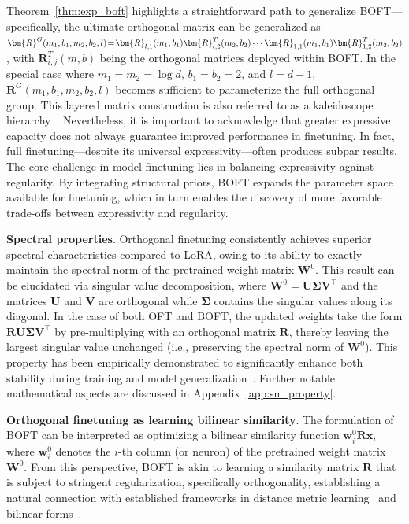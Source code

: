 Theorem~\ref{thm:exp_boft} highlights a straightforward path to generalize BOFT—specifically, the ultimate orthogonal matrix can be generalized as $\thickmuskip=2mu \medmuskip=2mu \bm{R}^G(m_1,b_1,m_2,b_2,l)=\bm{R}_{l,1}(m_1,b_1)\bm{R}_{l,2}^T(m_2,b_2)\cdots\bm{R}_{1,1}(m_1,b_1)\bm{R}_{1,2}^T(m_2,b_2)$, with $\bm{R}_{i,j}^T(m,b)$ being the orthogonal matrices deployed within BOFT. In the special case where $m_1=m_2=\log d$, $b_1=b_2=2$, and $l=d-1$, $\bm{R}^G(m_1,b_1,m_2,b_2,l)$ becomes sufficient to parameterize the full orthogonal group. This layered matrix construction is also referred to as a kaleidoscope hierarchy~\cite{dao2019kaleidoscope}. Nevertheless, it is important to acknowledge that greater expressive capacity does not always guarantee improved performance in finetuning. In fact, full finetuning—despite its universal expressivity—often produces subpar results. The core challenge in model finetuning lies in balancing expressivity against regularity. By integrating structural priors, BOFT expands the parameter space available for finetuning, which in turn enables the discovery of more favorable trade-offs between expressivity and regularity.

\textbf{Spectral properties}. Orthogonal finetuning consistently achieves superior spectral characteristics compared to LoRA, owing to its ability to exactly maintain the spectral norm of the pretrained weight matrix $\bm{W}^0$. This result can be elucidated via singular value decomposition, where $\bm{W}^0=\bm{U}\bm{\Sigma}\bm{V}^\top$ and the matrices $\bm{U}$ and $\bm{V}$ are orthogonal while $\bm{\Sigma}$ contains the singular values along its diagonal. In the case of both OFT and BOFT, the updated weights take the form $\bm{R}\bm{U}\bm{\Sigma}\bm{V}^\top$ by pre-multiplying with an orthogonal matrix $\bm{R}$, thereby leaving the largest singular value unchanged (i.e., preserving the spectral norm of $\bm{W}^0$). This property has been empirically demonstrated to significantly enhance both stability during training and model generalization~\cite{miyato2018spectral,yoshida2017spectral}. Further notable mathematical aspects are discussed in Appendix~\ref{app:sn_property}.

\textbf{Orthogonal finetuning as learning bilinear similarity}. The formulation of BOFT can be interpreted as optimizing a bilinear similarity function $\bm{w}^0_i\bm{R}\bm{x}$, where $\bm{w}^0_i$ denotes the $i$-th column (or neuron) of the pretrained weight matrix $\bm{W}^0$. From this perspective, BOFT is akin to learning a similarity matrix $\bm{R}$ that is subject to stringent regularization, specifically orthogonality, establishing a natural connection with established frameworks in distance metric learning~\cite{xing2002distance} and bilinear forms~\cite{roman2005advanced}.

